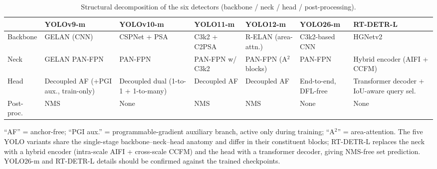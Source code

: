 \begin{table}[ht]
  \centering
  \caption{Structural decomposition of the six detectors (backbone / neck / head / post-processing).}
  \label{tab:detector_anatomy}
  \footnotesize
  \setlength{\tabcolsep}{4pt}
  \renewcommand{\arraystretch}{1.3}
  \begin{tabularx}{\textwidth}{l *{6}{>{\centering\arraybackslash}X}}
    \toprule
     & YOLOv9-m & YOLOv10-m & YOLO11-m & YOLO12-m & YOLO26-m & RT-DETR-L \\
    \midrule
    Backbone
     & GELAN (CNN)
     & CSPNet + PSA
     & C3k2 + C2PSA
     & R-ELAN (area-attn.)
     & C3k2-based CNN
     & HGNetv2 \\
    \addlinespace
    Neck
     & GELAN PAN-FPN
     & PAN-FPN
     & PAN-FPN w/ C3k2
     & PAN-FPN (A$^2$ blocks)
     & PAN-FPN
     & Hybrid encoder (AIFI + CCFM) \\
    \addlinespace
    Head
     & Decoupled AF (+PGI aux., train-only)
     & Decoupled dual (1-to-1 + 1-to-many)
     & Decoupled AF
     & Decoupled AF
     & End-to-end, DFL-free
     & Transformer decoder + IoU-aware query sel. \\
    \addlinespace
    Post-proc.
     & NMS
     & None
     & NMS
     & NMS
     & None
     & None \\
    \bottomrule
  \end{tabularx}
  \par\smallskip
  \footnotesize ``AF'' = anchor-free; ``PGI aux.'' = programmable-gradient auxiliary branch, active only during training; ``A$^2$'' = area-attention. The five YOLO variants share the single-stage backbone--neck--head anatomy and differ in their constituent blocks; RT-DETR-L replaces the neck with a hybrid encoder (intra-scale AIFI + cross-scale CCFM) and the head with a transformer decoder, giving NMS-free set prediction. YOLO26-m and RT-DETR-L details should be confirmed against the trained checkpoints.
\end{table}
